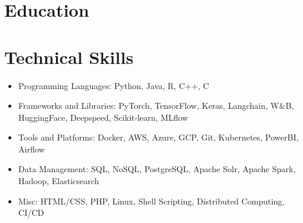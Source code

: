 \documentclass{ExpressiveResume}
\begin{document}
\resumeheader[
    firstname=Vijay Murari,
    middleinitial=,
    lastname=Tiyyala,
    email=mleng.nlp@gmail.com,
    phone=+12405711678,
    linkedin=vijaymuraritiyyala,
    website=imvijay23.github.io,
    state=Baltimore, MD,
]
\section{Education}

\vspace{7pt}
\section{Technical Skills}

\begin{itemize}
\item Programming Languages: Python, Java, R, C++, C
\item Frameworks and Libraries: PyTorch, TensorFlow, Keras, Langchain, W\&B, HuggingFace, Deepspeed, Scikit-learn, MLflow 
\item Tools and Platforms: Docker, AWS, Azure, GCP, Git, Kubernetes, PowerBI, Airflow
\item Data Management: SQL, NoSQL, PostgreSQL, Apache Solr, Apache Spark, Hadoop, Elasticsearch
\item Misc: HTML/CSS, PHP, Linux, Shell Scripting, Distributed Computing, CI/CD
\end{itemize}
\end{document}
